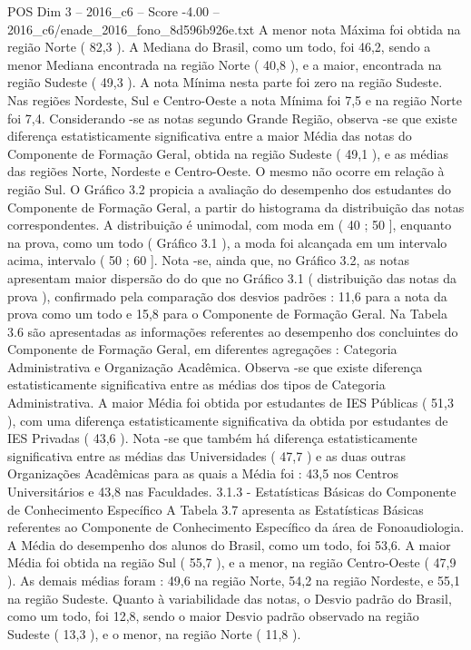 \begin{textsample}{POS Dim 3 – 2016\_c6 – Score -4.00 – 2016\_c6/enade\_2016\_fono\_8d596b926e.txt}
A menor nota Máxima foi obtida na região Norte ( 82,3 ).
A Mediana do Brasil, como um todo, foi 46,2, sendo a menor Mediana encontrada na região Norte ( 40,8 ), e a maior, encontrada na região Sudeste ( 49,3 ).
A nota Mínima nesta parte foi zero na região Sudeste.
Nas regiões Nordeste, Sul e Centro-Oeste a nota Mínima foi 7,5 e na região Norte foi 7,4.
Considerando -se as notas segundo Grande Região, observa -se que existe diferença estatisticamente significativa entre a maior Média das notas do Componente de Formação Geral, obtida na região Sudeste ( 49,1 ), e as médias das regiões Norte, Nordeste e Centro-Oeste.
O mesmo não ocorre em relação à região Sul.
O Gráfico 3.2 propicia a avaliação do desempenho dos estudantes do Componente de Formação Geral, a partir do histograma da distribuição das notas correspondentes.
A distribuição é unimodal, com moda em ( 40 ; 50 ], enquanto na prova, como um todo ( Gráfico 3.1 ), a moda foi alcançada em um intervalo acima, intervalo ( 50 ; 60 ].
Nota -se, ainda que, no Gráfico 3.2, as notas apresentam maior dispersão do do que no Gráfico 3.1 ( distribuição das notas da prova ), confirmado pela comparação dos desvios padrões : 11,6 para a nota da prova como um todo e 15,8 para o Componente de Formação Geral.
Na Tabela 3.6 são apresentadas as informações referentes ao desempenho dos concluintes do Componente de Formação Geral, em diferentes agregações : Categoria Administrativa e Organização Acadêmica.
Observa -se que existe diferença estatisticamente significativa entre as médias dos tipos de Categoria Administrativa.
A maior Média foi obtida por estudantes de IES Públicas ( 51,3 ), com uma diferença estatisticamente significativa da obtida por estudantes de IES Privadas ( 43,6 ).
Nota -se que também há diferença estatisticamente significativa entre as médias das Universidades ( 47,7 ) e as duas outras Organizações Acadêmicas para as quais a Média foi : 43,5 nos Centros Universitários e 43,8 nas Faculdades. 3.1.3 - Estatísticas Básicas do Componente de Conhecimento Específico A Tabela 3.7 apresenta as Estatísticas Básicas referentes ao Componente de Conhecimento Específico da área de Fonoaudiologia.
A Média do desempenho dos alunos do Brasil, como um todo, foi 53,6.
A maior Média foi obtida na região Sul ( 55,7 ), e a menor, na região Centro-Oeste ( 47,9 ).
As demais médias foram : 49,6 na região Norte, 54,2 na região Nordeste, e 55,1 na região Sudeste.
Quanto à variabilidade das notas, o Desvio padrão do Brasil, como um todo, foi 12,8, sendo o maior Desvio padrão observado na região Sudeste ( 13,3 ), e o menor, na região Norte ( 11,8 ).

\end{textsample}
